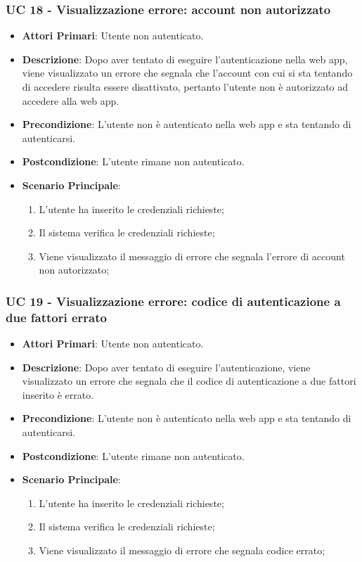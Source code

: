 		\subsubsection{UC 18 - Visualizzazione errore: account non autorizzato}
		\begin{itemize}
			\item \textbf{Attori Primari}: Utente non autenticato.
			\item \textbf{Descrizione}: Dopo aver tentato di eseguire l'autenticazione nella web app, viene visualizzato un errore che segnala che l'account con cui si sta tentando di accedere risulta essere disattivato, pertanto l'utente non è autorizzato ad accedere alla web app.
			\item \textbf{Precondizione}: L'utente non è autenticato nella web app e sta tentando di autenticarsi.
			\item \textbf{Postcondizione}: L'utente rimane non autenticato.
			\item \textbf{Scenario Principale}:
			\begin{enumerate}
				\item L'utente ha inserito le credenziali richieste;
				\item Il sistema verifica le credenziali richieste;
				\item Viene visualizzato il messaggio di errore che segnala l'errore di account non autorizzato;
			\end{enumerate}
		\end{itemize}


		\subsubsection{UC 19 - Visualizzazione errore: codice di autenticazione a due fattori errato}
		\begin{itemize}
			\item \textbf{Attori Primari}: Utente non autenticato.
			\item \textbf{Descrizione}: Dopo aver tentato di eseguire l'autenticazione, viene visualizzato un errore che segnala che il codice di autenticazione a due fattori inserito è errato.
			\item \textbf{Precondizione}: L'utente non è autenticato nella web app e sta tentando di autenticarsi.
			\item \textbf{Postcondizione}: L'utente rimane non autenticato.
			\item \textbf{Scenario Principale}:
			\begin{enumerate}
				\item L'utente ha inserito le credenziali richieste;
				\item Il sistema verifica le credenziali richieste;
				\item Viene visualizzato il messaggio di errore che segnala codice errato;
			\end{enumerate}
		\end{itemize}


